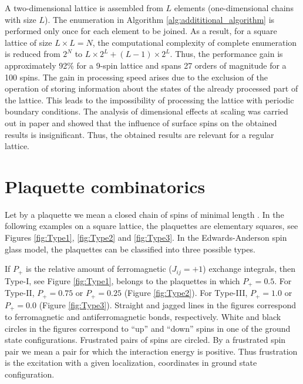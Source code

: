 \documentclass[preprint,12pt]{elsarticle}
\begin{document}
	A two-dimensional lattice is assembled from $L$ elements (one-dimensional chains with size $L$). The enumeration in Algorithm \ref{alg:addititional_algorithm} is performed only once for each element to be joined. As a result, for a square lattice of size $L \times L = N$, the computational complexity of complete enumeration is reduced from $2^{N}$ to $L \times 2^L + (L - 1) \times 2^L$. Thus, the performance gain is approximately 92\% for a 9-spin lattice and spans 27 orders of magnitude for a 100 spins. The gain in processing speed arises due to the exclusion of the operation of storing information about the states of the already processed part of the lattice. This leads to the impossibility of processing the lattice with periodic boundary conditions. The analysis of dimensional effects at scaling was carried out in paper \cite{trukhin2024thermodynamic} and showed that the influence of surface spins on the obtained results is insignificant. Thus, the obtained results are relevant for a regular lattice.
	
	\section{Plaquette combinatorics}
	
	Let by a plaquette we mean a closed chain of spins of minimal length \cite{lebrecht2015j}. In the following examples on a square lattice, the plaquettes are elementary squares, see Figures \ref{fig:Type1}, \ref{fig:Type2} and \ref{fig:Type3}. In the Edwards-Anderson spin glass model, the plaquettes can be classified into three possible types. 
	
	If $P_+$ is the relative amount of ferromagnetic ($J_{ij}=+1$) exchange integrals, then Type-I, see Figure \ref{fig:Type1}, belongs to the plaquettes in which $P_+=0.5$. For Type-II, $P_+=0.75$ or $P_+=0.25$ (Figure \ref{fig:Type2}). For Type-III, $P_+=1.0$ or $P_+=0.0$ (Figure \ref{fig:Type3}). Straight and jagged lines in the figures correspond to ferromagnetic and antiferromagnetic bonds, respectively. White and black circles in the figures correspond to ``up'' and ``down'' spins in one of the ground state configurations. Frustrated pairs of spins are circled. By a frustrated spin pair we mean a pair for which the interaction energy is positive. Thus frustration is the excitation with a given localization, coordinates in ground state configuration.
	
\end{document}
